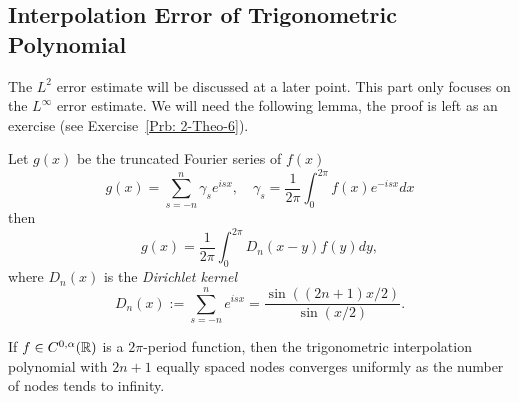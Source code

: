 \subsection{Interpolation Error of Trigonometric Polynomial}
\label{SSec: 2-Int-Err-Tri-Pol}
The $L^2$ error estimate will be discussed at a later point. This part only focuses on the $L^{\infty}$ error estimate. We will need the following lemma, the proof is left as an exercise (see Exercise~\ref{Prb: 2-Theo-6}).
\begin{lemma}
\label{Lem: 2-Dir-Ker}
    Let $g(x)$ be the truncated Fourier series of $f(x)$
     $$g(x) = \sum_{s = -n}^n \gamma_s e^{is x},\quad \gamma_s = \frac{1}{2\pi}\int_{0}^{2\pi} f(x) e^{-isx} dx$$
     then 
     \begin{equation}
         g(x) =\frac{1}{2\pi}  \int_{0}^{2\pi} D_n(x - y) f(y)   d y, 
     \end{equation}
     where $D_n(x)$ is the \emph{Dirichlet kernel}
     \begin{equation}
         D_n(x):=  \sum_{s=-n}^{n} e^{is x} = \frac{\sin((2n+1)x/2)}{\sin(x/2)}.
     \end{equation}
\end{lemma}
\begin{theorem}
\label{Thm: 2-Uni-Conv-C2}
    If $f\in C^{0,\alpha}(\mathbb R)$ is a $2\pi$-period function, then the trigonometric interpolation polynomial with $2n+1$ equally spaced nodes converges uniformly as the number of nodes tends to infinity.
\end{theorem}
